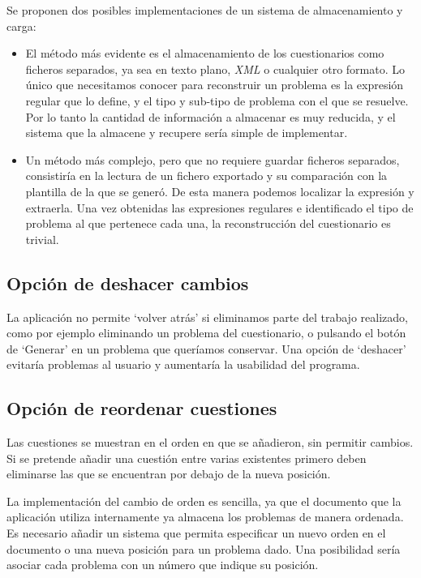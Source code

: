 Se proponen dos posibles implementaciones de un sistema de almacenamiento y carga:
\begin{itemize}
	\item El método más evidente es el almacenamiento de los cuestionarios como ficheros separados, ya sea en texto plano, \emph{XML} o cualquier otro formato.
	Lo único que necesitamos conocer para reconstruir un problema es la expresión regular que lo define, y el tipo y sub-tipo de problema con el que se resuelve.
	Por lo tanto la cantidad de información a almacenar es muy reducida, y el sistema que la almacene y recupere sería simple de implementar.
	\item Un método más complejo, pero que no requiere guardar ficheros separados, consistiría en la lectura de un fichero exportado y su comparación con la plantilla de la que se generó.
	De esta manera podemos localizar la expresión y extraerla.
	Una vez obtenidas las expresiones regulares e identificado el tipo de problema al que pertenece cada una, la reconstrucción del cuestionario es trivial.
\end{itemize}

\subsection{Opción de deshacer cambios}
La aplicación no permite `volver atrás' si eliminamos parte del trabajo realizado, como por ejemplo eliminando un problema del cuestionario, o pulsando el botón de `Generar' en un problema que queríamos conservar.
Una opción de `deshacer' evitaría problemas al usuario y aumentaría la usabilidad del programa.

\subsection{Opción de reordenar cuestiones}
Las cuestiones se muestran en el orden en que se añadieron, sin permitir cambios.
Si se pretende añadir una cuestión entre varias existentes primero deben eliminarse las que se encuentran por debajo de la nueva posición.

La implementación del cambio de orden es sencilla, ya que el documento que la aplicación utiliza internamente ya almacena los problemas de manera ordenada.
Es necesario añadir un sistema que permita especificar un nuevo orden en el documento o una nueva posición para un problema dado.
Una posibilidad sería asociar cada problema con un número que indique su posición.

